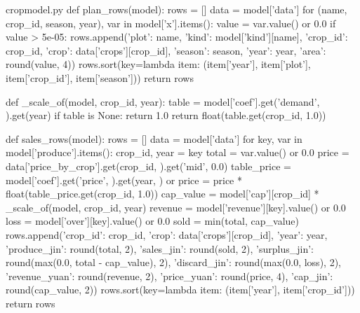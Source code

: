\documentclass[bwprint]{gmcmthesis}
\begin{document}
\begin{appendices}
\begin{Python}{cropmodel.py}
def plan_rows(model):
    rows = []
    data = model['data']
    for (name, crop_id, season, year), var in model['x'].items():
        value = var.value() or 0.0
        if value > 5e-05:
            rows.append({'plot': name, 'kind': model['kind'][name], 'crop_id': crop_id, 'crop': data['crops'][crop_id], 'season': season, 'year': year, 'area': round(value, 4)})
    rows.sort(key=lambda item: (item['year'], item['plot'], item['crop_id'], item['season']))
    return rows

def _scale_of(model, crop_id, year):
    table = model['coef'].get('demand', {}).get(year)
    if table is None:
        return 1.0
    return float(table.get(crop_id, 1.0))

def sales_rows(model):
    rows = []
    data = model['data']
    for key, var in model['produce'].items():
        crop_id, year = key
        total = var.value() or 0.0
        price = data['price_by_crop'].get(crop_id, {}).get('mid', 0.0)
        table_price = model['coef'].get('price', {}).get(year, {}) or {}
        price = price * float(table_price.get(crop_id, 1.0))
        cap_value = model['cap'][crop_id] * _scale_of(model, crop_id, year)
        revenue = model['revenue'][key].value() or 0.0
        loss = model['over'][key].value() or 0.0
        sold = min(total, cap_value)
        rows.append({'crop_id': crop_id, 'crop': data['crops'][crop_id], 'year': year, 'produce_jin': round(total, 2), 'sales_jin': round(sold, 2), 'surplus_jin': round(max(0.0, total - cap_value), 2), 'discard_jin': round(max(0.0, loss), 2), 'revenue_yuan': round(revenue, 2), 'price_yuan': round(price, 4), 'cap_jin': round(cap_value, 2)})
    rows.sort(key=lambda item: (item['year'], item['crop_id']))
    return rows


\end{Python}
\end{appendices}
\end{document}
